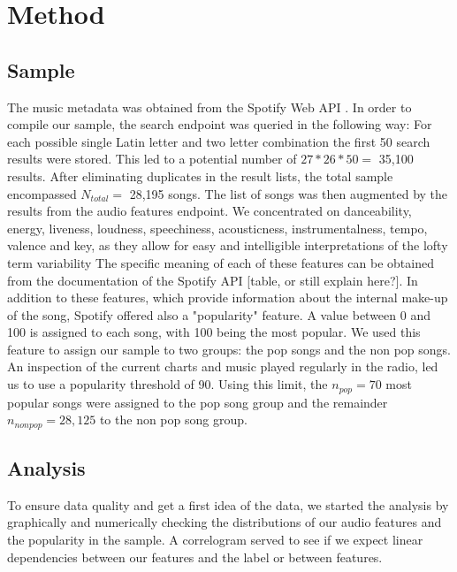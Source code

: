 \documentclass{article}
\begin{document}
\section{Method}

\subsection{Sample}
The music metadata was obtained from the Spotify Web API \citep{spotify}. In order to compile our sample, the search endpoint was queried in the following way: For each possible single Latin letter and two letter combination the first 50 search results were stored. This led to a potential number of \(27 * 26 * 50 =\) 35,100 results. After eliminating duplicates in the result lists, the total sample encompassed \(N_{total} =\) 28,195 songs. The list of songs was then augmented by the results from the audio features endpoint. We concentrated on danceability, energy, liveness, loudness, speechiness, acousticness, instrumentalness, tempo, valence and key, as they allow for easy and intelligible interpretations of the lofty term variability %
The specific meaning of each of these features can be obtained from the documentation of the Spotify API \citep{spotifyAPIdocu}[table, or still explain here?]. In addition to these features, which provide information about the internal make-up of the song, Spotify offered also a "popularity" feature. A value between 0 and 100 is assigned to each song, with 100 being the most popular. We used this feature to assign our sample to two groups: the pop songs and the non pop songs. An inspection of the current charts and music played regularly in the radio, led us to use a popularity threshold of 90. Using this limit, the \(n_{pop} = 70\) most popular songs were assigned to the pop song group and the remainder \(n_{non pop} = 28,125\) to the non pop song group.

\subsection{Analysis}
To ensure data quality and get a first idea of the data, we started the analysis by graphically and numerically checking the distributions of our audio features and the popularity in the sample. A correlogram served to see if we expect linear dependencies between our features and the label or between features.
\end{document}
